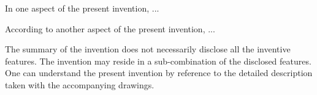



In one aspect of the present invention,  
	...




According to another aspect of the present invention, 
	...








The summary of the invention does not necessarily disclose all the inventive features. 
The invention may reside in a sub-combination of the disclosed features. 
One can understand the present invention by reference to the detailed description taken with the accompanying drawings.




